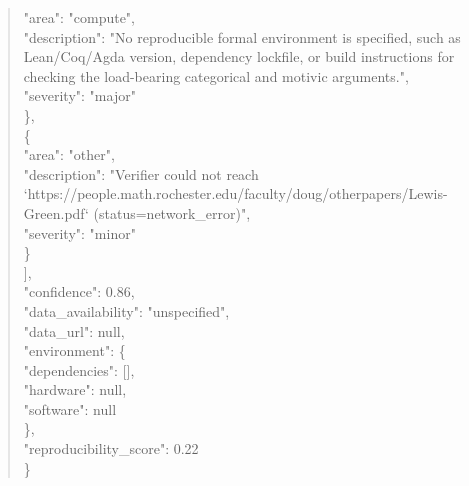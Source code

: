 \documentclass[11pt]{article}
\begin{document}
\begin{quote}
      "area": "compute",\\
      "description": "No reproducible formal environment is specified, such as Lean/Coq/Agda version, dependency lockfile, or build instructions for checking the load-bearing categorical and motivic arguments.",\\
      "severity": "major"\\
    \},\\
    \{\\
      "area": "other",\\
      "description": "Verifier could not reach `https://people.math.rochester.edu/faculty/doug/otherpapers/Lewis-Green.pdf` (status=network\_error)",\\
      "severity": "minor"\\
    \}\\
  ],\\
  "confidence": 0.86,\\
  "data\_availability": "unspecified",\\
  "data\_url": null,\\
  "environment": \{\\
    "dependencies": [],\\
    "hardware": null,\\
    "software": null\\
  \},\\
  "reproducibility\_score": 0.22\\
\}\\
\end{quote}
\end{document}
